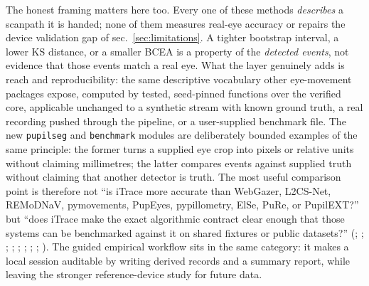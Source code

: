 \documentclass[
]{article}
\begin{document}
The honest framing matters here too. Every one of these methods
\emph{describes} a scanpath it is handed; none of them measures real-eye
accuracy or repairs the device validation gap of
sec.~\ref{sec:limitations}. A tighter bootstrap interval, a lower KS
distance, or a smaller BCEA is a property of the \emph{detected events},
not evidence that those events match a real eye. What the layer
genuinely adds is reach and reproducibility: the same descriptive
vocabulary other eye-movement packages expose, computed by tested,
seed-pinned functions over the verified core, applicable unchanged to a
synthetic stream with known ground truth, a real recording pushed
through the pipeline, or a user-supplied benchmark file. The new
\texttt{pupilseg} and \texttt{benchmark} modules are deliberately
bounded examples of the same principle: the former turns a supplied eye
crop into pixels or relative units without claiming millimetres; the
latter compares events against supplied truth without claiming that
another detector is truth. The most useful comparison point is therefore
not ``is iTrace more accurate than WebGazer, L2CS-Net, REMoDNaV,
pymovements, PupEyes, pypillometry, ElSe, PuRe, or PupilEXT?'' but
``does iTrace make the exact algorithmic contract clear enough that
those systems can be benchmarked against it on shared fixtures or public
datasets?'' (; ;
;
;
;
;
;
;
). The guided
empirical workflow sits in the same category: it makes a local session
auditable by writing derived records and a summary report, while leaving
the stronger reference-device study for future data.
\end{document}
